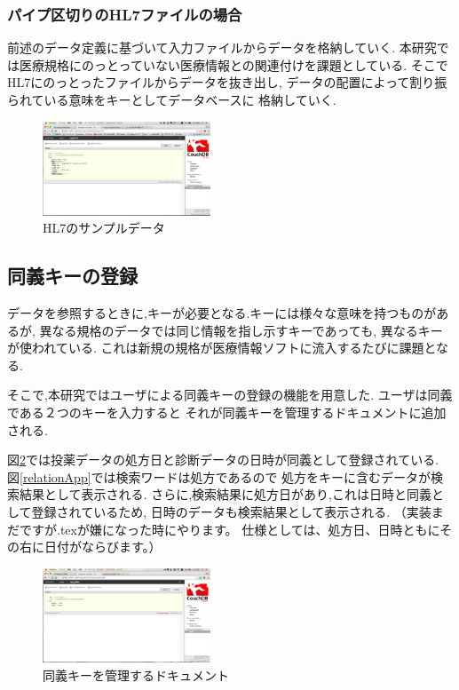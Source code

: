 		\subsubsection{パイプ区切りのHL7ファイルの場合}
			前述のデータ定義に基づいて入力ファイルからデータを格納していく.
			本研究では医療規格にのっとっていない医療情報との関連付けを課題としている.
			そこでHL7にのっとったファイルからデータを抜き出し,
			データの配置によって割り振られている意味をキーとしてデータベースに
			格納していく.

			\begin{figure}[htbp]
					\includegraphics[width=5cm, bb=0 0 437 688]{./gazou/hl7.png}
				\caption{HL7のサンプルデータ}
				\label{hl7-data}
			\end{figure}



\subsection{同義キーの登録}
	データを参照するときに,キーが必要となる.キーには様々な意味を持つものがあるが,
	異なる規格のデータでは同じ情報を指し示すキーであっても,
	異なるキーが使われている.
	これは新規の規格が医療情報ソフトに流入するたびに課題となる.

	そこで,本研究ではユーザによる同義キーの登録の機能を用意した.
	ユーザは同義である２つのキーを入力すると
	それが同義キーを管理するドキュメントに追加される.

	図\ref{relation}では投薬データの処方日と診断データの日時が同義として登録されている.
	図\ref{relationApp}では検索ワードは処方であるので
	処方をキーに含むデータが検索結果として表示される.
	さらに,検索結果に処方日があり,これは日時と同義として登録されているため,
	日時のデータも検索結果として表示される.
	（実装まだですが.texが嫌になった時にやります。
	仕様としては、処方日、日時ともにその右に日付がならびます。）

	\begin{figure}[htbp]
			\includegraphics[width=5cm, bb=0 0 437 688]{./gazou/relation.png}
		\caption{同義キーを管理するドキュメント}
		\label{relation}
	\end{figure}

